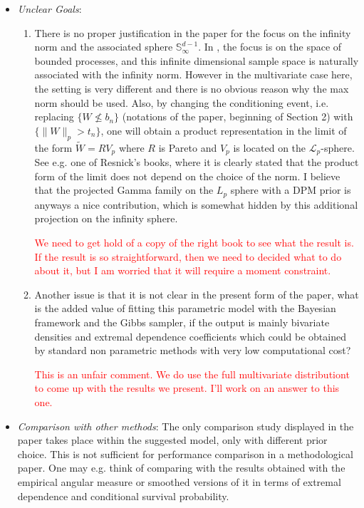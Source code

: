 \documentclass[10pt]{article}
\newcommand{\bruno}[1]{\textcolor{red}{#1}}
\begin{document}
\begin{itemize}
    \item \emph{Unclear Goals}: 
    \begin{enumerate}
        \item There is no proper justification in the paper for the focus on the infinity norm 
        and the associated sphere $\mathbb{S}_{\infty}^{d-1}$. In \cite{ferreira2014}, the focus
        is on the space of bounded processes, and this infinite dimensional sample space is 
        naturally associated with the infinity norm. However in the multivariate case here, the 
        setting is very different and there is no obvious reason why the max norm should be used. 
        Also, by changing the conditioning event, i.e. replacing $\lbrace W \not\leq b_{n}\rbrace$
        (notations of the paper, beginning of Section 2) with 
        $\lbrace \lVert W\rVert_p > t_n\rbrace$, one will obtain a product representation in the 
        limit of the form $\tilde{W} = RV_p$ where $R$ is Pareto and $V_p$ is located on the 
        $\mathcal{L}_p$-sphere. See e.g. one of Resnick’s books, where it is clearly stated that 
        the product form of the limit does not depend on the choice of the norm. I believe that 
        the projected Gamma family on the $L_p$ sphere with a DPM prior is anyways a nice 
        contribution, which is somewhat hidden by this additional projection on the infinity sphere.

        \bruno{We need to get hold of a copy of the right book to see what the result is. If the result 
        is so straightforward, then we need to decided what to do about it, but I am worried that
        it will require a moment constraint.}
        
        \item Another issue is that it is not clear in the present form of the paper, what is the
        added value of fitting this parametric model with the Bayesian framework and the Gibbs 
        sampler, if the output is mainly bivariate densities and extremal dependence coefficients 
        which could be obtained by standard non parametric methods with very low computational cost?

        \bruno{This is an unfair comment. We do use the full multivariate distributiont to come up
        with the results we present. I'll work on an answer to this one.}
    \end{enumerate}

\item \emph{Comparison with other methods}: The only comparison study displayed in the paper 
    takes place within the suggested model, only with different prior choice. This is not sufficient 
    for performance comparison in a methodological paper. One may e.g. think of comparing with the
    results obtained with the empirical angular measure or smoothed versions of it in terms of 
    extremal dependence and conditional survival probability.


\end{itemize}
\end{document}
